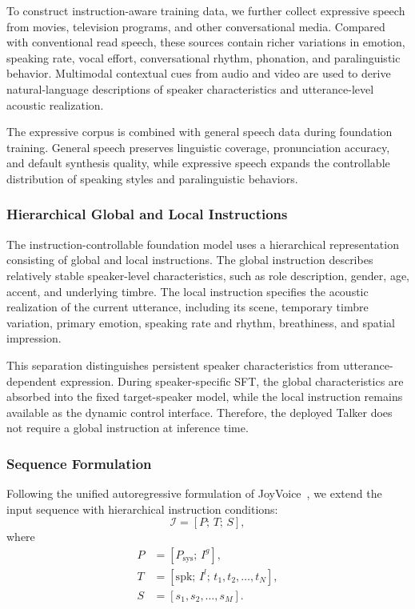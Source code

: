 To construct instruction-aware training data, we further collect expressive
speech from movies, television programs, and other conversational media.
Compared with conventional read speech, these sources contain richer variations
in emotion, speaking rate, vocal effort, conversational rhythm, phonation, and
paralinguistic behavior. Multimodal contextual cues from audio and video are
used to derive natural-language descriptions of speaker characteristics and
utterance-level acoustic realization.

The expressive corpus is combined with general speech data during foundation
training. General speech preserves linguistic coverage, pronunciation accuracy,
and default synthesis quality, while expressive speech expands the controllable
distribution of speaking styles and paralinguistic behaviors.

\subsubsection{Hierarchical Global and Local Instructions}

The instruction-controllable foundation model uses a hierarchical representation
consisting of global and local instructions. The global instruction describes
relatively stable speaker-level characteristics, such as role description,
gender, age, accent, and underlying timbre. The local instruction specifies
the acoustic realization of the current utterance, including its scene,
temporary timbre variation, primary emotion, speaking rate and rhythm,
breathiness, and spatial impression.

This separation distinguishes persistent speaker characteristics from
utterance-dependent expression. During speaker-specific SFT, the global
characteristics are absorbed into the fixed target-speaker model, while the
local instruction remains available as the dynamic control interface. Therefore,
the deployed Talker does not require a global instruction at inference time.

\subsubsection{Sequence Formulation}

Following the unified autoregressive formulation of
JoyVoice~\cite{joyvoice}, we extend the input sequence with hierarchical
instruction conditions:
\begin{equation}
\mathcal{I}
=
\left[
P;\,T;\,S
\right],
\end{equation}
where
\begin{equation}
\begin{split}
P &=
\left[
P_{\mathrm{sys}};\,
I^{g}
\right],\\
T &=
\left[
\mathrm{spk};\,
I^{l};\,
t_{1},t_{2},\ldots,t_{N}
\right],\\
S &=
\left[
s_{1},s_{2},\ldots,s_{M}
\right].
\end{split}
\end{equation}

